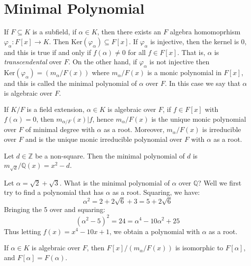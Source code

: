 \section{Minimal Polynomial}
    If $F\subseteq{K}$ is a subfield, if $\alpha\in{K}$, then there exists
    an $F$ algebra homomoprhism $\varphi_{\alpha}:F[x]\rightarrow{K}$.
    Then $\textrm{Ker}(\varphi_{\alpha})\subseteq{F}[x]$. If
    $\varphi_{\alpha}$ is injective, then the kernel is 0, and this is
    true if and only if $f(\alpha)\ne{0}$ for all $f\in{F}[x]$. That is,
    $\alpha$ is \textit{transcendental} over $F$. On the other hand, if
    $\varphi_{\alpha}$ is not injective then
    $\textrm{Ker}(\varphi_{\alpha})=(m_{\alpha}/F(x))$ where
    $m_{\alpha}/F(x)$ is a monic polynomial in $F[x]$, and this is called
    the minimal polynomial of $\alpha$ over $F$. In this case we say that
    $\alpha$ is algebraic over $F$.
    \begin{theorem}
        If $K/F$ is a field extension, $\alpha\in{K}$ is algebraic over $F$,
        if $f\in{F}[x]$ with $f(\alpha)=0$, then
        $m_{\alpha/F}(x)|f$, hence $m_{\alpha}/F(x)$ is the unique monic
        polynomial over $F$ of minimal degree with $\alpha$ as a root.
        Moreover, $m_{\alpha}/F(x)$ is irreducible over $F$ and is the
        unique monic irreducible polynomial over $F$ with $\alpha$ as a
        root.
    \end{theorem}
    \begin{example}
        Let $d\in\mathbb{Z}$ be a non-square. Then the minimal polynomial of
        $d$ is $m_{\sqrt{d}}/\mathbb{Q}(x)=x^{2}-d$.
    \end{example}
    \begin{example}
        Let $\alpha=\sqrt{2}+\sqrt{3}$. What is the minimal polynomial of
        $\alpha$ over $\mathbb{Q}$? Well we first try to find a polynomial
        that has $\alpha$ as a root. Squaring, we have:
        \begin{equation}
            \alpha^{2}=2+2\sqrt{6}+3=5+2\sqrt{6}
        \end{equation}
        Bringing the 5 over and squaring:
        \begin{equation}
            (\alpha^{2}-5)^{2}=24=\alpha^{4}-10\alpha^{2}+25
        \end{equation}
        Thus letting $f(x)=x^{4}-10x+1$, we obtain a polynomial with
        $\alpha$ as a root.
    \end{example}
    \begin{theorem}
        If $\alpha\in{K}$ is algebraic over $F$, then
        $F[x]/(m_{\alpha}/F(x))$ is isomorphic to $F[\alpha]$, and
        $F[\alpha]=F(\alpha)$.
    \end{theorem}
